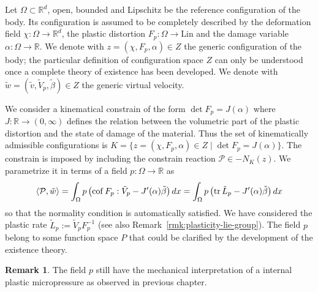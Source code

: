 \documentclass[a4paper,10pt,twoside]{amsbook}
\numberwithin{section}{chapter}
\numberwithin{equation}{chapter}
\theoremstyle{definition}
\newtheorem{rmk}[prop]{Remark}
\DeclareMathOperator{\cof}{cof}
\DeclareMathOperator{\tr}{tr}
\DeclarePairedDelimiter{\dual}{\langle}{\rangle}
\begin{document}
Let $\Omega\subset\mathbb{R}^d$, open, bounded and Lipschitz be the reference configuration of the body. Its configuration is assumed to be completely described by the deformation field $\chi\colon\Omega\to\mathbb{R}^d$, the plastic distortion $F_p\colon\Omega\to\text{Lin}$ and the damage variable $\alpha\colon\Omega\to\mathbb{R}$. We denote with $z=(\chi,F_p,\alpha)\in Z$ the generic configuration of the body; the particular definition of configuration space $Z$ can only be understood once a complete theory of existence has been developed. We denote with $\tilde w=(\tilde v,\tilde V_p,\tilde\beta)\in Z$ the generic virtual velocity.

We consider a kinematical constrain of the form $\det F_p=J(\alpha)$ where $J\colon\mathbb{R}\to(0,\infty)$ defines the relation between the volumetric part of the plastic distortion and the state of damage of the material. Thus the set of kinematically admissible configurations is $K=\{z=(\chi,F_p,\alpha)\in Z\;|\;\det F_p=J(\alpha)\}$. The constrain is imposed by including the constrain reaction $\mathcal{P}\in-N_K(z)$. We parametrize it in terms of a field $p\colon\Omega\to\mathbb{R}$ as
\[
\dual{\mathcal{P},\tilde w}=\int_\Omega p\left(\cof F_p:\tilde V_p-J'(\alpha)\tilde\beta\right)dx=\int_\Omega p\left(\tr\tilde L_p-J'(\alpha)\tilde\beta\right)dx
\]
so that the normality condition is automatically satisfied. We have considered the plastic rate $\tilde L_p:=\tilde V_pF_p^{-1}$ (see also Remark~\ref{rmk:plasticity-lie-group}). The field $p$ belong to some function space $P$ that could be clarified by the development of the existence theory.
\begin{rmk}
The field $p$ still have the mechanical interpretation of a internal plastic micropressure as observed in previous chapter.
\end{rmk}
\end{document}
